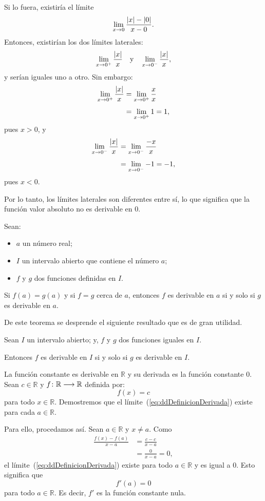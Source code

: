 Si lo fuera, existiría el límite
\[
\limjc{\frac{|x| - |0|}{x - 0}}{x}{0}.
\]
Entonces, existirían los dos límites laterales:
\[
\limjc{\frac{|x|}{x}}{x}{0^+}\yjc \limjc{\frac{|x|}{x}}{x}{0^-},
\]
y serían iguales uno a otro. Sin embargo:
\begin{align*}
\limjc{\frac{|x|}{x}}{x}{0^+} &= \limjc{\frac{x}{x}}{x}{0^+} \\[4pt]
  &= \limjc{1}{x}{0^+} = 1,
\end{align*}
pues $x > 0$, y
\begin{align*}
\limjc{\frac{|x|}{x}}{x}{0^-} &= \limjc{\frac{-x}{x}}{x}{0^-} \\[4pt]
  &= \limjc{-1}{x}{0^-} = -1,
\end{align*}
pues $x < 0$.

Por lo tanto, los límites laterales son diferentes entre sí, lo que significa que la función valor
absoluto no es derivable en $0$.

\begin{teocal}
Sean:
\begin{itemize}
\item[] $a$ un número real;
\item[] $I$ un intervalo abierto que contiene el número $a$;
\item[] $f$ y $g$ dos funciones definidas en $I$.
\end{itemize}
Si $f(a)=g(a)$ y si $f=g$ cerca de $a$, entonces $f$ es derivable en $a$ si y solo si $g$ es derivable en $a$.
\end{teocal}

De este teorema se desprende el siguiente resultado que es de gran utilidad.

\begin{teocal}
Sean $I$ un intervalo abierto; y, $f$ y $g$ dos funciones iguales en $I$.

Entonces $f$ es derivable en $I$ si y solo si $g$ es derivable en $I$.
\end{teocal}

\begin{exemplo}[Solución]{%
La función constante es derivable en $\mathbb{R}$ y su derivada es la función constante $0$.
}%
Sean $c\in\mathbb{R}$ y $\funcjc{f}{\mathbb{R}}{\mathbb{R}}$ definida por:
\[
f(x) = c
\]
para todo $x\in\mathbb{R}$. Demostremos que el límite~(\ref{eq:ddDefinicionDerivada}) existe para
cada $a\in\mathbb{R}$.

Para ello, procedamos así. Sean $a\in\mathbb{R}$ y $x\neq a$. Como
\begin{align*}
\frac{f(x) - f(a)}{x - a} &= \frac{c - c}{x - a} \\[4pt]
  &= \frac{0}{x - a} = 0,
\end{align*}
el límite~(\ref{eq:ddDefinicionDerivada}) existe para todo $a\in\mathbb{R}$ y es igual a $0$. Esto
significa que
\[
f'(a) = 0
\]
para todo $a\in \mathbb{R}$. Es decir, $f'$ es la función constante nula.
\end{exemplo}

